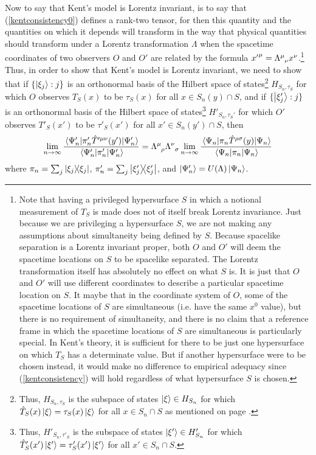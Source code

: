 Now to say that Kent's model is Lorentz invariant, is to say that (\ref{kentconsistency0}) defines a rank-two tensor, for then this quantity and the quantities on which it depends will transform in the way that physical quantities should transform under a Lorentz transformation $\Lambda$ when the spacetime coordinates of two observers $O$ and $O'$ are related by the formula ${x'}^\mu=\Lambda\indices{^\mu_\nu}x^\nu$.\footnote{Note that having a privileged hypersurface $S$ in which a notional measurement of $T_S$ is made does not of itself break Lorentz invariance. Just because we are privileging a hypersurface $S$, we are not making any assumptions about simultaneity being defined by $S$. Because spacelike separation is a Lorentz invariant proper, both $O$ and $O'$ will deem the spacetime locations on $S$ to be spacelike separated. The Lorentz transformation itself has absolutely no effect on what $S$ is. It is just that $O$ and $O'$ will use different coordinates to describe a particular spacetime location on $S$. It maybe that in the coordinate system of $O$, some of the spacetime locations of $S$ are simultaneous (i.e. have the same $x^0$ value), but there is no requirement of simultaneity, and there is no claim that a reference frame in which the spacetime locations of $S$ are simultaneous is particularly special. In Kent's theory, it is sufficient for there to be just one hypersurface on which  $T_S$ has a determinate value. But if another hypersurface were to be chosen instead, it would make no difference to empirical adequacy since (\ref{kentconsistency}) will hold regardless of what hypersurface $S$ is chosen.} Thus, in order to show that Kent's model is Lorentz invariant, we need to show that if $\{\ket{\xi_j}:j\}$ is an orthonormal basis of the Hilbert space of states\footnote{Thus, $H_{S_n,\tau_S}$ is the subspace of states $\ket{\xi}\in H_{S_n}$ for which  $\hat{T}_S(x)\ket{\xi}=\tau_S(x)\ket{\xi}$  for all $x\in S_n\cap S$ as mentioned on page \pageref{HStau}.} $H_{S_n,\tau_S}$ for which $O$ observes $T_S(x)$ to be $\tau_S(x)$ for all $x\in S_n(y)\cap S$, and if $\{\ket{\xi_j'}:j\}$ is an orthonormal basis of the Hilbert space of states\footnote{Thus,  $H'_{S_n,\tau'_S}$ is the subspace of states $\ket{\xi'}\in H'_{S_n}$ for which  $\hat{T}'_S(x')\ket{\xi'}=\tau'_S(x')\ket{\xi'}$  for all $x'\in S_n\cap S$. } $H'_{S_n,\tau_S'}$ for which $O'$ observes $T'_S(x')$ to be $\tau'_S(x')$ for all $x'\in S_n(y')\cap S$, then
\begin{equation}\label{kentlorentz}
\lim_{n\rightarrow\infty}\frac{\ev{\pi_n'\hat{T}^{\prime\mu\nu}(y')}{\Psi_n'}}{\ev{\pi_n'}{\Psi_n'}}=\Lambda\indices{^\mu_\rho}\Lambda\indices{^\nu_\sigma} \lim_{n\rightarrow\infty}\frac{\ev{\pi_n\hat{T}^{\rho\sigma}(y)}{\Psi_n}}{\ev{\pi_n}{\Psi_n}}
\end{equation}
where $\pi_n=\sum_j\dyad{\xi_j}$, $\pi_n'=\sum_j\dyad{\xi_j'}$, and $\ket{\Psi_n'}=U(\Lambda)\ket{\Psi_n}$. 

